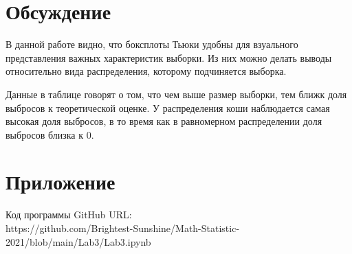 \documentclass[a4paper]{article}
\begin{document}
\section{Обсуждение}
В данной работе видно, что боксплоты Тьюки удобны для взуального представления важных
характеристик выборки. Из них можно делать выводы относительно
вида распределения, которому подчиняется выборка.

Данные в таблице говорят о том, что чем выше размер выборки, тем ближк доля выбросов к теоретической оценке. У распределения коши наблюдается самая высокая доля выбросов, в то время как в равномерном распределении доля выбросов близка к 0.

\section{Приложение}

\noindent Код программы GitHub URL:\\
\newline https://github.com/Brightest-Sunshine/Math-Statistic-2021/blob/main/Lab3/Lab3.ipynb
\end{document}

